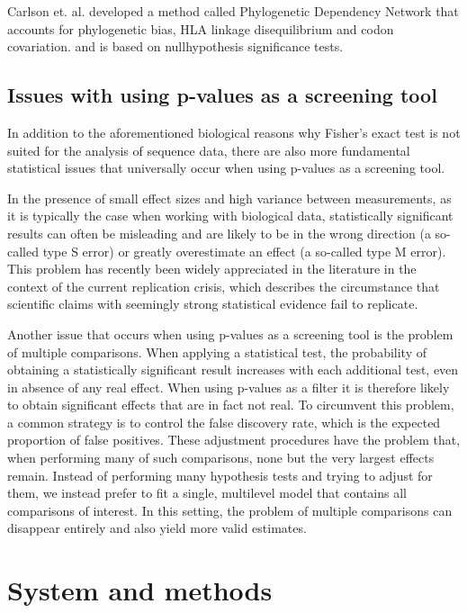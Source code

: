 \documentclass[fleqn,11pt]{SelfArx} %
\begin{document}
Carlson et. al. developed a method called Phylogenetic Dependency Network
that accounts for phylogenetic bias, HLA linkage disequilibrium and codon covariation.
and is based on nullhypothesis significance tests.

\subsection{Issues with using p-values as a screening tool}

In addition to the aforementioned biological reasons why Fisher's exact test is 
not suited for the analysis of sequence data, there are also more fundamental statistical
issues that universally occur when using p-values as a screening tool.

In the presence of small effect sizes and high variance between measurements, as 
it is typically the case when working with biological data, statistically significant
results can often be misleading and are likely to be in the wrong direction
(a so-called type S error) or greatly overestimate an effect (a so-called type M error).
This problem has recently been widely appreciated in the literature in the context
of the current \glqq replication crisis\grqq{}, which describes the circumstance that
scientific claims with seemingly strong statistical evidence fail to replicate.

Another issue that occurs when using p-values as a screening tool is the problem
of multiple comparisons. When applying a statistical test, the probability  of 
obtaining a statistically significant result increases with
each additional test, even in absence of any real effect. When using p-values as a filter
it is therefore likely to obtain significant effects that are in fact not real.
To circumvent this problem, a common strategy is to control the false discovery
rate, which is the expected proportion of false positives.
These adjustment procedures have the problem that, when performing many of such comparisons,
none but the very largest effects remain.
Instead of performing many hypothesis tests and trying to adjust for them, we instead prefer
to fit a single, multilevel model that contains all comparisons of interest.
In this setting, the problem of multiple comparisons can disappear entirely and also
yield more valid estimates.

\section{System and methods}
\end{document}
